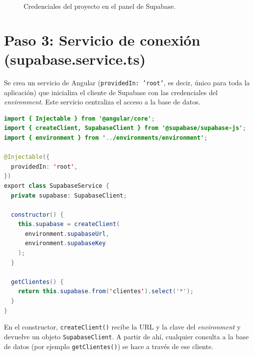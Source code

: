 \documentclass[11pt,a4paper]{article}
\begin{document}
\begin{figure}[H]
  \centering
  \caption{Credenciales del proyecto en el panel de Supabase.}
  \label{fig:credenciales}
\end{figure}

\section{Paso 3: Servicio de conexión (supabase.service.ts)}

Se crea un servicio de Angular (\texttt{providedIn: 'root'}, es decir, único
para toda la aplicación) que inicializa el cliente de Supabase con las
credenciales del \textit{environment}. Este servicio centraliza el acceso a la
base de datos.

\begin{lstlisting}[language=Java,caption={src/app/supabase.service.ts}]
import { Injectable } from '@angular/core';
import { createClient, SupabaseClient } from '@supabase/supabase-js';
import { environment } from '../environments/environment';

@Injectable({
  providedIn: 'root',
})
export class SupabaseService {
  private supabase: SupabaseClient;

  constructor() {
    this.supabase = createClient(
      environment.supabaseUrl,
      environment.supabaseKey
    );
  }

  getClientes() {
    return this.supabase.from('clientes').select('*');
  }
}
\end{lstlisting}

En el constructor, \texttt{createClient()} recibe la URL y la clave del
\textit{environment} y devuelve un objeto \texttt{SupabaseClient}. A partir de
ahí, cualquier consulta a la base de datos (por ejemplo \texttt{getClientes()})
se hace a través de ese cliente.
\end{document}
